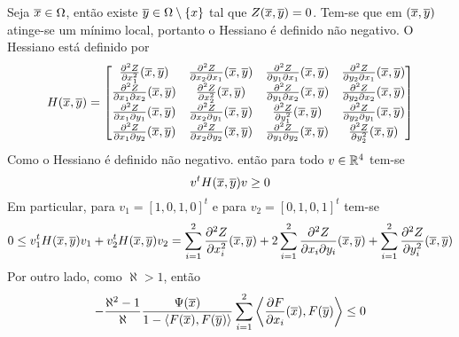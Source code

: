 \begin{demonstracao}
	Seja $\overline{x} \in \Omega$, então existe $\overline{y} \in \Omega \setminus \{x\}$ tal que $Z(\overline{x},\overline{y}) = 0$. Tem-se que em $(\overline{x},\overline{y})$ atinge-se um mínimo local, portanto o Hessiano é definido não negativo. O Hessiano está definido por
	\begin{equation*}
		H(\overline{x},\overline{y}) = \left[ \begin{matrix}
		\frac{\partial^2 Z}{\partial x_1^2}(\overline{x},\overline{y}) & \frac{\partial^2 Z}{\partial x_2 \partial x_1}(\overline{x},\overline{y}) & \frac{\partial^2 Z}{\partial y_1 \partial x_1}(\overline{x},\overline{y}) & \frac{\partial^2 Z}{\partial y_2 \partial x_1}(\overline{x},\overline{y})\\ 
		\frac{\partial^2 Z}{\partial x_1 \partial x_2}(\overline{x},\overline{y}) & \frac{\partial^2 Z}{\partial x_2^2}(\overline{x},\overline{y}) & \frac{\partial^2 Z}{\partial y_1 \partial x_2}(\overline{x},\overline{y}) & \frac{\partial^2 Z}{\partial y_2 \partial x_2}(\overline{x},\overline{y})\\
		 \frac{\partial^2 Z}{\partial x_1 \partial y_1}(\overline{x},\overline{y}) & \frac{\partial^2 Z}{\partial x_2 \partial y_1}(\overline{x},\overline{y}) & \frac{\partial^2 Z}{\partial y_1^2}(\overline{x},\overline{y}) & \frac{\partial^2 Z}{\partial y_2 \partial y_1}(\overline{x},\overline{y})\\
		  \frac{\partial^2 Z}{\partial x_1 \partial y_2}(\overline{x},\overline{y}) & \frac{\partial^2 Z}{\partial x_2 \partial y_2}(\overline{x},\overline{y}) & \frac{\partial^2 Z}{\partial y_1 \partial y_2}(\overline{x},\overline{y}) & \frac{\partial^2 Z}{\partial y_2^2}(\overline{x},\overline{y})
		\end{matrix} \right]
	\end{equation*}	
	Como o Hessiano é definido não negativo. então para todo $v \in \mathbb{R}^4$ tem-se
	\begin{equation*}
		v^t H(\overline{x},\overline{y}) v \geq 0
	\end{equation*}	
	Em particular, para $v_1 = [1,0,1,0]^t$ e para $v_2 = [0,1,0,1]^t$ tem-se
	\begin{equation*}
		0 \leq v_1^t H(\overline{x},\overline{y}) v_1 + v_2^t H(\overline{x},\overline{y}) v_ 2 = \sum_{i=1}^2 \frac{\partial^2 Z}{\partial x_i^2}(\overline{x},\overline{y}) + 2 \sum_{i=1}^2 \frac{\partial^2 Z}{\partial x_i \partial y_i}(\overline{x},\overline{y}) + \sum_{i=1}^2 \frac{\partial^2 Z}{\partial y_i^2}(\overline{x},\overline{y})
	\end{equation*}	
	Por outro lado, como $\aleph > 1$, então
	\begin{equation*}
		- \frac{\aleph^2 - 1}{\aleph} \frac{\Psi(\xbarra)}{1 - \langle F(\xbarra), F(\ybarra) \rangle} \sum_{i=1}^2 \left\langle \frac{\partial F}{\partial x_i}(\xbarra), F(\ybarra) \right\rangle \leq 0

\end{equation*}
\end{demonstracao}
